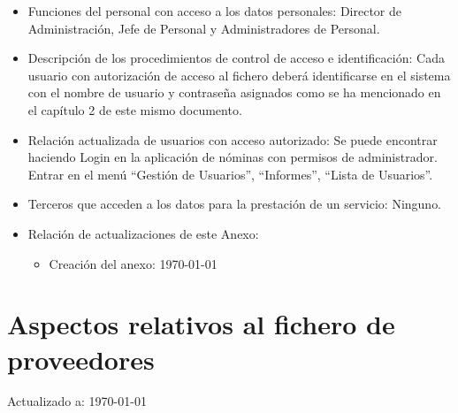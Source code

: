 \documentclass[a4paper,11pt,bibtotoc,noliststotoc]{scrbook}
\begin{document}
\begin{itemize}
\item Funciones del personal con acceso a los datos personales: Director de Administración, Jefe de Personal y Administradores de Personal.

\item Descripción de los procedimientos de control de acceso e identificación: Cada usuario con autorización de acceso al fichero deberá identificarse en el sistema con el nombre de usuario y contraseña asignados como se ha mencionado en el capítulo 2 de este mismo documento.

\item Relación actualizada de usuarios con acceso autorizado: Se puede encontrar haciendo Login en la aplicación de nóminas con permisos de administrador. Entrar en el menú "`Gestión de Usuarios"', "`Informes"', "`Lista de Usuarios"'.

\item Terceros que acceden a los datos para la prestación de un servicio: Ninguno.

\item Relación de actualizaciones de este Anexo:  

	\begin{itemize}
	\item Creación del anexo: \today
	\end{itemize}

\end{itemize}







\section{Aspectos relativos al fichero de proveedores}


Actualizado a: \today
\end{document}
